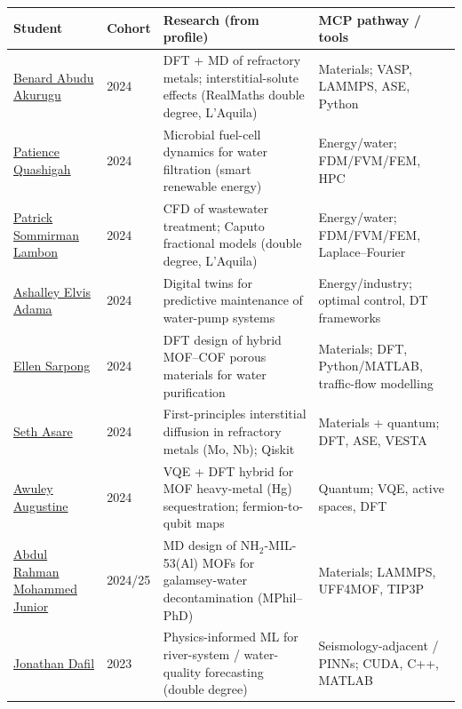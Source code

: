 \documentclass[11pt,a4paper]{article}
\begin{document}
\begin{longtable}{@{}p{3.2cm}p{1.3cm}p{5.4cm}p{5.3cm}@{}}
\toprule
\textbf{Student} & \textbf{Cohort} & \textbf{Research (from profile)} & \textbf{MCP pathway / tools} \\
\midrule
\endhead
\href{https://physics.knust.edu.gh/benard-abudu-profile}{Benard Abudu Akurugu} & 2024 & DFT + MD of refractory metals; interstitial-solute effects (RealMaths double degree, L'Aquila) & Materials; VASP, LAMMPS, ASE, Python \\
\midrule
\href{https://physics.knust.edu.gh/patience-quashiga-mphil-student}{Patience Quashigah} & 2024 & Microbial fuel-cell dynamics for water filtration (smart renewable energy) & Energy/water; FDM/FVM/FEM, HPC \\
\midrule
\href{https://physics.knust.edu.gh/patrick-sommirman-lambon-mphil-student}{Patrick Sommirman Lambon} & 2024 & CFD of wastewater treatment; Caputo fractional models (double degree, L'Aquila) & Energy/water; FDM/FVM/FEM, Laplace--Fourier \\
\midrule
\href{https://physics.knust.edu.gh/ashalley-elvis-adama-profile}{Ashalley Elvis Adama} & 2024 & Digital twins for predictive maintenance of water-pump systems & Energy/industry; optimal control, DT frameworks \\
\midrule
\href{https://physics.knust.edu.gh/ellen-sarpong-mphil-student}{Ellen Sarpong} & 2024 & DFT design of hybrid MOF--COF porous materials for water purification & Materials; DFT, Python/MATLAB, traffic-flow modelling \\
\midrule
\href{https://physics.knust.edu.gh/seth-asare-profile}{Seth Asare} & 2024 & First-principles interstitial diffusion in refractory metals (Mo, Nb); Qiskit & Materials + quantum; DFT, ASE, VESTA \\
\midrule
\href{https://physics.knust.edu.gh/awuley-augustine-profile}{Awuley Augustine} & 2024 & VQE + DFT hybrid for MOF heavy-metal (Hg) sequestration; fermion-to-qubit maps & Quantum; VQE, active spaces, DFT \\
\midrule
\href{https://physics.knust.edu.gh/abdul-rahman-junior-mohammed-profile}{Abdul Rahman Mohammed Junior} & 2024/25 & MD design of NH$_2$-MIL-53(Al) MOFs for galamsey-water decontamination (MPhil--PhD) & Materials; LAMMPS, UFF4MOF, TIP3P \\
\midrule
\href{https://physics.knust.edu.gh/jonathan-dafil-profile}{Jonathan Dafil} & 2023 & Physics-informed ML for river-system / water-quality forecasting (double degree) & Seismology-adjacent / PINNs; CUDA, C++, MATLAB \\
\bottomrule
\end{longtable}
\end{document}
